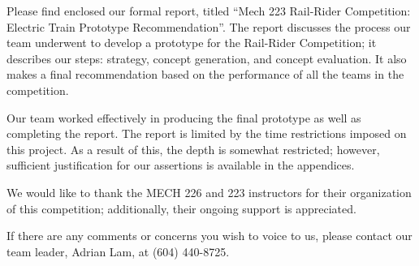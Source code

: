 \documentclass{letter}
\title{}
\author{Adrian Lam, Aliia Almazbekova, David Stewart, Jacky Chang, Janelle Lawson, Jasper Chan}
\date{\today}
\begin{document}
\maketitle

Please find enclosed our formal report, titled “Mech 223 Rail-Rider Competition: Electric Train Prototype Recommendation”.
The report discusses the process our team underwent to develop a prototype for the Rail-Rider Competition; it describes our steps: strategy, concept generation, and concept evaluation.
It also makes a final recommendation based on the performance of all the teams in the competition.

Our team worked effectively in producing the final prototype as well as completing the report.
The report is limited by the time restrictions imposed on this project.
As a result of this, the depth is somewhat restricted; however, sufficient justification for our assertions is available in the appendices. 

We would like to thank the MECH 226 and 223 instructors for their organization of this competition; additionally, their ongoing support is appreciated. 

If there are any comments or concerns you wish to voice to us, please contact our team leader, Adrian Lam, at (604) 440-8725.

\makeend
\end{document}
